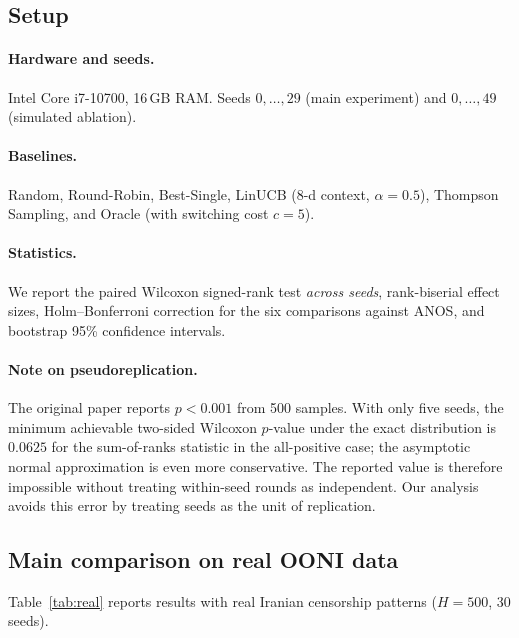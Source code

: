 \documentclass[11pt,a4paper]{article}
\begin{document}
\subsection{Setup}

\paragraph{Hardware and seeds.}
Intel Core i7-10700, 16\,GB RAM. Seeds $0,\dots,29$ (main experiment)
and $0,\dots,49$ (simulated ablation).

\paragraph{Baselines.}
Random, Round-Robin, Best-Single, LinUCB (8-d context,
$\alpha=0.5$), Thompson Sampling, and Oracle (with switching cost
$c=5$).

\paragraph{Statistics.}
We report the paired Wilcoxon signed-rank test \emph{across seeds},
rank-biserial effect sizes, Holm--Bonferroni correction for the six
comparisons against ANOS, and bootstrap 95\% confidence intervals.

\paragraph{Note on pseudoreplication.}
The original paper reports $p<0.001$ from 500 samples. With only
five seeds, the minimum achievable two-sided Wilcoxon $p$-value
under the exact distribution is $0.0625$ for the sum-of-ranks
statistic in the all-positive case; the asymptotic normal
approximation is even more conservative. The reported value is
therefore impossible without treating within-seed rounds as
independent. Our analysis avoids this error by treating seeds as
the unit of replication.

\subsection{Main comparison on real OONI data}

Table~\ref{tab:real} reports results with real Iranian censorship
patterns ($H=500$, 30 seeds).
\end{document}
